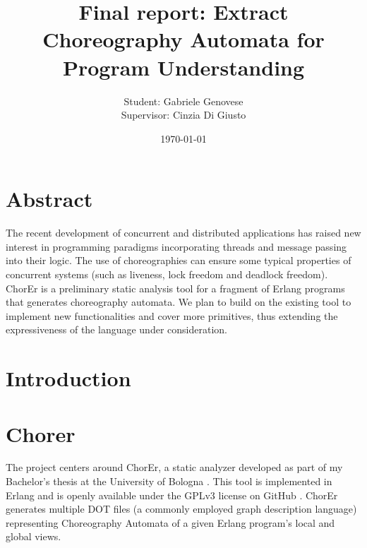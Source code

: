 \documentclass{article}
\title{Final report: Extract Choreography Automata for Program Understanding}
\author{Student: Gabriele Genovese\\Supervisor: Cinzia Di Giusto}
\date{\today}
\theoremstyle{definition}
\theoremstyle{definition}
\begin{document}
\maketitle


\section*{Abstract}
The recent development of concurrent and distributed applications has raised new
interest in programming paradigms incorporating threads and message passing into
their logic. The use of choreographies
can ensure some typical properties of concurrent systems (such as liveness, lock
freedom and deadlock freedom). ChorEr is a preliminary static analysis tool for
a fragment of Erlang programs that generates choreography automata. We plan to
build on the existing tool to implement new functionalities and cover more
primitives, thus extending the expressiveness of the language under consideration.

\newpage

\tableofcontents

\newpage

\section{Introduction}


% 

% 

% 

% 

\section{Chorer}
The project centers around ChorEr, a static analyzer 
developed as part of my Bachelor's thesis at the University of Bologna 
\cite{genovese2023chorer}. This tool is implemented in Erlang and is openly 
available under the GPLv3 license on GitHub \cite{website:chorer}. ChorEr 
generates multiple DOT files (a commonly employed graph description language) 
representing Choreography Automata of a given Erlang program's local and 
global views.
\end{document}
